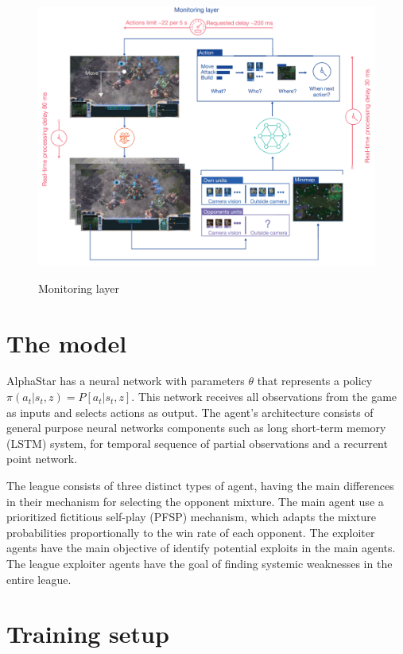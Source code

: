 \documentclass[
    article, 
    12pt,				%
	oneside,			%
	a4paper,			%
	chapter=TITLE,		%
	section=TITLE,		%
	english,			%
	english,				%
	sumario=tradicional
]{abntex2}
\begin{document}
\begin{figure}[ht]
    \centering
    \caption{Monitoring layer}
    \includegraphics[width=\textwidth]{images/monitoring_layer.png}
    \label{fig:monitoring_layer}
\end{figure}

\section{The model}

AlphaStar has a neural network with parameters $\theta$ that represents a policy $\pi(a_t | s_t,z) = P[a_t | s_t,z]$. 
This network receives all observations from the game as inputs and selects actions as output. 
The agent's architecture consists of general purpose neural networks components such as long short-term memory (LSTM) system, for temporal sequence of partial observations and a recurrent point network.

The league consists of three distinct types of agent, having the main differences in their mechanism for selecting the opponent mixture.
The main agent use a prioritized fictitious self-play (PFSP) mechanism, which adapts the mixture probabilities proportionally to the win rate of each opponent. 
The exploiter agents have the main objective of identify potential exploits in the main agents. 
The league exploiter agents have the goal of finding systemic weaknesses in the entire league.

\section{Training setup}
\end{document}
